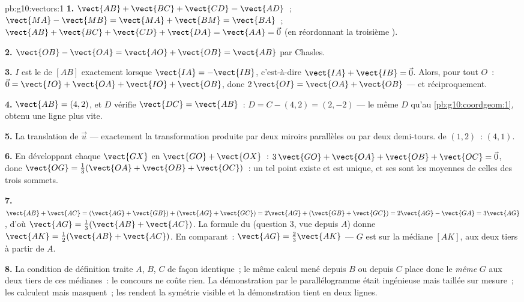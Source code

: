 \begin{solution}{pb:g10:vectors:1}
\textbf{1.} $\vect{AB} + \vect{BC} + \vect{CD} = \vect{AD}$~;
\quad $\vect{MA} - \vect{MB} = \vect{MA} + \vect{BM} = \vect{BA}$~;
\quad $\vect{AB} + \vect{BC} + \vect{CD} + \vect{DA} = \vect{AA} =
\vec 0$ (en réordonnant la troisième ).

\textbf{2.} $\vect{OB} - \vect{OA} = \vect{AO} + \vect{OB} =
\vect{AB}$ par Chasles.

\textbf{3.} $I$ est le  de $[AB]$ exactement lorsque
$\vect{IA} = -\vect{IB}$, c'est-à-dire
$\vect{IA} + \vect{IB} = \vec 0$. Alors, pour tout $O$~:
$\vec 0 = \vect{IO} + \vect{OA} + \vect{IO} + \vect{OB}$, donc
$2\,\vect{OI} = \vect{OA} + \vect{OB}$ --- et réciproquement.

\textbf{4.} $\vect{AB} = (4, 2)$, et $D$ vérifie
$\vect{DC} = \vect{AB}$~: $D = C - (4, 2) = (2, -2)$ --- le même $D$
qu'au \cref{pb:g10:coordgeom:1}, obtenu une ligne plus vite.

\textbf{5.} La translation de  $\vec u$ --- exactement la
transformation produite par deux miroirs parallèles ou par deux
demi-tours.  de $(1, 2)$~: $(4, 1)$.

\textbf{6.} En développant chaque $\vect{GX}$ en
$\vect{GO} + \vect{OX}$~:
$3\,\vect{GO} + \vect{OA} + \vect{OB} + \vect{OC} = \vec 0$, donc
$\vect{OG} = \frac13(\vect{OA} + \vect{OB} + \vect{OC})$~: un tel
point existe et est unique, et ses  sont les moyennes de
celles des trois sommets.

\textbf{7.} $\vect{AB} + \vect{AC} =
(\vect{AG} + \vect{GB}) + (\vect{AG} + \vect{GC})
= 2\vect{AG} + (\vect{GB} + \vect{GC})
= 2\vect{AG} - \vect{GA} = 3\vect{AG}$, d'où
$\vect{AG} = \frac13(\vect{AB} + \vect{AC})$. La formule du 
(question 3, vue depuis $A$) donne
$\vect{AK} = \frac12(\vect{AB} + \vect{AC})$. En comparant~:
$\vect{AG} = \frac23\vect{AK}$ --- $G$ est sur la médiane $[AK]$, aux
deux tiers à partir de $A$.

\textbf{8.} La condition de définition traite $A$, $B$, $C$ de façon
identique~; le même calcul mené depuis $B$ ou depuis $C$ place donc
le \emph{même} $G$ aux deux tiers de ces médianes~: le concours ne
coûte rien. La démonstration par le parallélogramme était ingénieuse
mais taillée sur mesure~; les  calculent mais masquent~;
les  rendent la symétrie visible et la démonstration tient en
deux lignes.


\end{solution}
